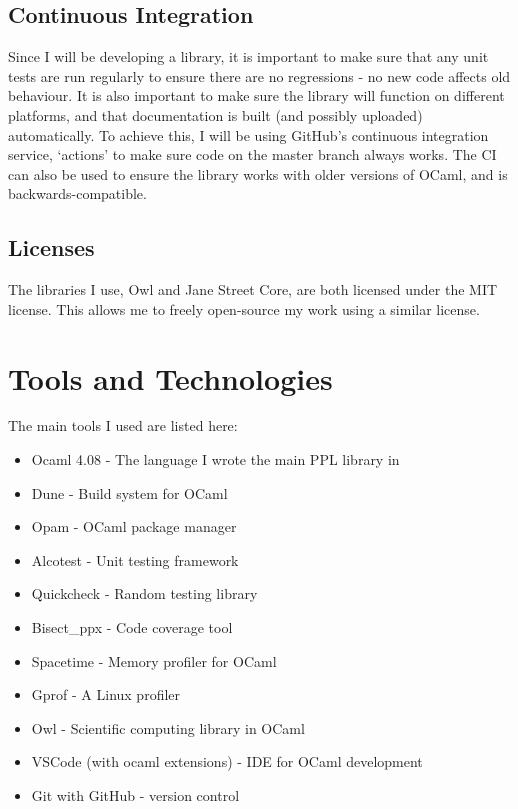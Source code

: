 \subsection{Continuous Integration}
Since I will be developing a library, it is important to make sure that any unit tests are run regularly to ensure there are no regressions - no new code affects old behaviour. It is also important to make sure the library will function on different platforms, and that documentation is built (and possibly uploaded) automatically. To achieve this, I will be using GitHub's continuous integration service, `actions' to make sure code on the master branch always works. The CI can also be used to ensure the library works with older versions of OCaml, and is backwards-compatible.

\subsection{Licenses}

The libraries I use, Owl and Jane Street Core, are both licensed under the MIT license. This allows me to freely open-source my work using a similar license.
\section{Tools and Technologies}
The main tools I used are listed here:
\begin{itemize}
	\item Ocaml 4.08 - The language I wrote the main PPL library in
	\item Dune - Build system for OCaml
	\item Opam - OCaml package manager
	\item Alcotest - Unit testing framework
	\item Quickcheck - Random testing library
	\item Bisect\_ppx - Code coverage tool
	\item Spacetime - Memory profiler for OCaml
	\item Gprof - A Linux profiler
	\item Owl - Scientific computing library in OCaml
	\item VSCode (with ocaml extensions) - IDE for OCaml development
	\item Git with GitHub - version control
\end{itemize}

